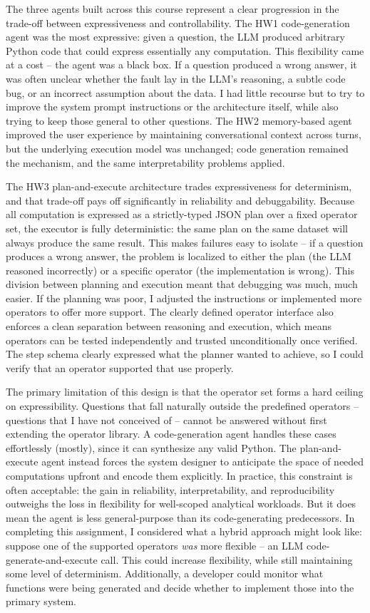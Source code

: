 The three agents built across this course represent a clear progression in the trade-off between expressiveness and controllability. The HW1 code-generation agent was the most expressive: given a question, the LLM produced arbitrary Python code that could express essentially any computation. This flexibility came at a cost -- the agent was a black box. If a question produced a wrong answer, it was often unclear whether the fault lay in the LLM's reasoning, a subtle code bug, or an incorrect assumption about the data. I had little recourse but to try to improve the system prompt instructions or the architecture itself, while also trying to keep those general to other questions. The HW2 memory-based agent improved the user experience by maintaining conversational context across turns, but the underlying execution model was unchanged; code generation remained the mechanism, and the same interpretability problems applied.

The HW3 plan-and-execute architecture trades expressiveness for determinism, and that trade-off pays off significantly in reliability and debuggability. Because all computation is expressed as a strictly-typed JSON plan over a fixed operator set, the executor is fully deterministic: the same plan on the same dataset will always produce the same result. This makes failures easy to isolate -- if a question produces a wrong answer, the problem is localized to either the plan (the LLM reasoned incorrectly) or a specific operator (the implementation is wrong). This division between planning and execution meant that debugging was much, much easier. If the planning was poor, I adjusted the instructions or implemented more operators to offer more support. The clearly defined operator interface also enforces a clean separation between reasoning and execution, which means operators can be tested independently and trusted unconditionally once verified. The step schema clearly expressed what the planner wanted to achieve, so I could verify that an operator supported that use properly.

The primary limitation of this design is that the operator set forms a hard ceiling on expressibility. Questions that fall naturally outside the predefined operators -- questions that I have not conceived of -- cannot be answered without first extending the operator library. A code-generation agent handles these cases effortlessly (mostly), since it can synthesize any valid Python. The plan-and-execute agent instead forces the system designer to anticipate the space of needed computations upfront and encode them explicitly. In practice, this constraint is often acceptable: the gain in reliability, interpretability, and reproducibility outweighs the loss in flexibility for well-scoped analytical workloads. But it does mean the agent is less general-purpose than its code-generating predecessors. In completing this assignment, I considered what a hybrid approach might look like: suppose one of the supported operators \textit{was} more flexible -- an LLM code-generate-and-execute call. This could increase flexibility, while still maintaining some level of determinism. Additionally, a developer could monitor what functions were being generated and decide whether to implement those into the primary system.
